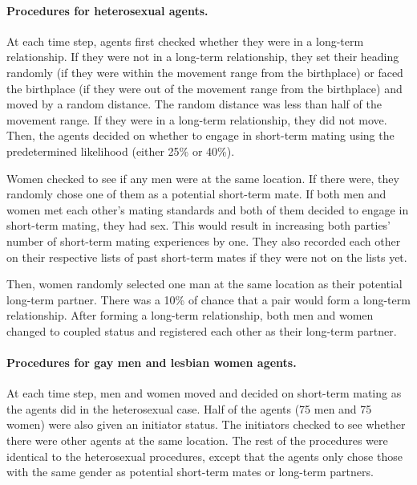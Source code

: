 \documentclass[
  11pt,
]{article}
\begin{document}
\hypertarget{procedures-for-heterosexual-agents.}{%
\paragraph{Procedures for heterosexual
agents.}\label{procedures-for-heterosexual-agents.}}

At each time step, agents first checked whether they were in a long-term
relationship. If they were not in a long-term relationship, they set
their heading randomly (if they were within the movement range from the
birthplace) or faced the birthplace (if they were out of the movement
range from the birthplace) and moved by a random distance. The random
distance was less than half of the movement range. If they were in a
long-term relationship, they did not move. Then, the agents decided on
whether to engage in short-term mating using the predetermined
likelihood (either 25\% or 40\%).

Women checked to see if any men were at the same location. If there
were, they randomly chose one of them as a potential short-term mate. If
both men and women met each other's mating standards and both of them
decided to engage in short-term mating, they had sex. This would result
in increasing both parties' number of short-term mating experiences by
one. They also recorded each other on their respective lists of past
short-term mates if they were not on the lists yet.

Then, women randomly selected one man at the same location as their
potential long-term partner. There was a 10\% of chance that a pair
would form a long-term relationship. After forming a long-term
relationship, both men and women changed to coupled status and
registered each other as their long-term partner.

\hypertarget{procedures-for-gay-men-and-lesbian-women-agents.}{%
\paragraph{Procedures for gay men and lesbian women
agents.}\label{procedures-for-gay-men-and-lesbian-women-agents.}}

At each time step, men and women moved and decided on short-term mating
as the agents did in the heterosexual case. Half of the agents (75 men
and 75 women) were also given an initiator status. The initiators
checked to see whether there were other agents at the same location. The
rest of the procedures were identical to the heterosexual procedures,
except that the agents only chose those with the same gender as
potential short-term mates or long-term partners.
\end{document}
